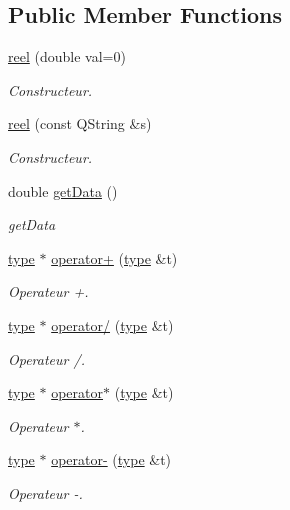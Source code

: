 \subsection*{Public Member Functions}
\begin{DoxyCompactItemize}
\item 
\hyperlink{classreel_af400a93dfd7cfa7447f8751ab32c48fc}{reel} (double val=0)
\begin{DoxyCompactList}\small\item\em Constructeur. \end{DoxyCompactList}\item 
\hyperlink{classreel_a6399912ce32c14c918ce5b6fb0b294dc}{reel} (const Q\-String \&s)
\begin{DoxyCompactList}\small\item\em Constructeur. \end{DoxyCompactList}\item 
double \hyperlink{classreel_ad1d16e6ce54fc6b8844757a8f04300ca}{get\-Data} ()
\begin{DoxyCompactList}\small\item\em get\-Data \end{DoxyCompactList}\item 
\hyperlink{classtype}{type} $\ast$ \hyperlink{classreel_af2ae884e68ab28b286cf9940f05f59d9}{operator+} (\hyperlink{classtype}{type} \&t)
\begin{DoxyCompactList}\small\item\em Operateur +. \end{DoxyCompactList}\item 
\hyperlink{classtype}{type} $\ast$ \hyperlink{classreel_a3bc55f29b377547040d47be018b73fe6}{operator/} (\hyperlink{classtype}{type} \&t)
\begin{DoxyCompactList}\small\item\em Operateur /. \end{DoxyCompactList}\item 
\hyperlink{classtype}{type} $\ast$ \hyperlink{classreel_a044791a71fd9926cbedf3f19f6eea122}{operator$\ast$} (\hyperlink{classtype}{type} \&t)
\begin{DoxyCompactList}\small\item\em Operateur $\ast$. \end{DoxyCompactList}\item 
\hyperlink{classtype}{type} $\ast$ \hyperlink{classreel_a9cd96b762004392eda5216262201322c}{operator-\/} (\hyperlink{classtype}{type} \&t)
\begin{DoxyCompactList}\small\item\em Operateur -\/. \end{DoxyCompactList}\item 

\end{DoxyCompactItemize}
